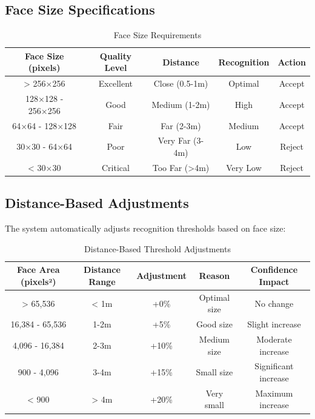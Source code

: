 \documentclass[12pt,a4paper]{article}
\begin{document}
\subsection{Face Size Specifications}

\begin{table}[h!]
\centering
\caption{Face Size Requirements}
\begin{tabular}{|c|c|c|c|c|}
\hline
\textbf{Face Size (pixels)} & \textbf{Quality Level} & \textbf{Distance} & \textbf{Recognition} & \textbf{Action} \\
\hline
> 256×256 & Excellent & Close (0.5-1m) & Optimal & Accept \\
\hline
128×128 - 256×256 & Good & Medium (1-2m) & High & Accept \\
\hline
64×64 - 128×128 & Fair & Far (2-3m) & Medium & Accept \\
\hline
30×30 - 64×64 & Poor & Very Far (3-4m) & Low & Reject \\
\hline
< 30×30 & Critical & Too Far (>4m) & Very Low & Reject \\
\hline
\end{tabular}
\end{table}

\subsection{Distance-Based Adjustments}

The system automatically adjusts recognition thresholds based on face size:

\begin{table}[h!]
\centering
\caption{Distance-Based Threshold Adjustments}
\begin{tabular}{|c|c|c|c|c|}
\hline
\textbf{Face Area (pixels²)} & \textbf{Distance Range} & \textbf{Adjustment} & \textbf{Reason} & \textbf{Confidence Impact} \\
\hline
> 65,536 & < 1m & +0\% & Optimal size & No change \\
\hline
16,384 - 65,536 & 1-2m & +5\% & Good size & Slight increase \\
\hline
4,096 - 16,384 & 2-3m & +10\% & Medium size & Moderate increase \\
\hline
900 - 4,096 & 3-4m & +15\% & Small size & Significant increase \\
\hline
< 900 & > 4m & +20\% & Very small & Maximum increase \\
\hline
\end{tabular}
\end{table}
\end{document}
